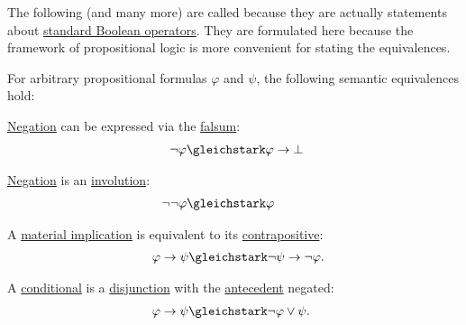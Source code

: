 \begin{proposition}\label{thm:boolean_equivalences}
  The following (and many more) are called  because they are actually statements about \hyperref[def:standard_boolean_operators]{standard Boolean operators}. They are formulated here because the framework of propositional logic is more convenient for stating the equivalences.

  For arbitrary propositional formulas \( \varphi \) and \( \psi \), the following semantic equivalences hold:
  \begin{thmenum}
     \hyperref[def:propositional_language/negation]{Negation} can be expressed via the \hyperref[def:propositional_language/constants/falsum]{falsum}:
    \begin{equation}\label{eq:thm:boolean_equivalences/negation_bottom}
      \begin{split}
        \mathllap{\neg \varphi} &\gleichstark \mathrlap{\varphi \rightarrow \bot}.
      \end{split}
    \end{equation}

     \hyperref[def:propositional_language/negation]{Negation} is an \hyperref[def:involution]{involution}:
    \begin{equation}\label{eq:thm:boolean_equivalences/double_negation}
      \begin{split}
        \mathllap{\neg \neg \varphi} &\gleichstark \mathrlap{\varphi}.
      \end{split}
    \end{equation}

     A \hyperref[def:material_implication]{material implication} is equivalent to its \hyperref[def:material_implication/contrapositive]{contrapositive}:
    \begin{equation}\label{eq:thm:boolean_equivalences/contrapositive}
      \begin{split}
        \mathllap{\varphi \rightarrow \psi} &\gleichstark \mathrlap{\neg \psi \rightarrow \neg \varphi.}
      \end{split}
    \end{equation}

     A \hyperref[def:propositional_language/connectives/conditional]{conditional} is a \hyperref[def:propositional_language/connectives/disjunction]{disjunction} with the \hyperref[def:material_implication/antecedent]{antecedent} negated:
    \begin{equation}\label{eq:thm:boolean_equivalences/conditional_as_disjunction}
      \begin{split}
        \mathllap{\varphi \rightarrow \psi} &\gleichstark \mathrlap{ \neg \varphi \vee \psi. }
      \end{split}
    \end{equation}


\end{thmenum}
\end{proposition}
